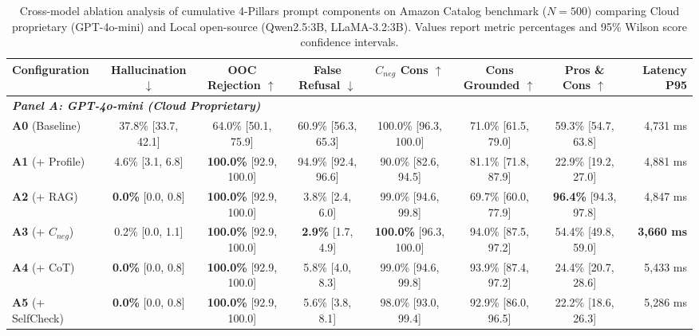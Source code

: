 
\begin{table}[t]
\centering
\caption{Cross-model ablation analysis of cumulative 4-Pillars prompt components on Amazon Catalog benchmark ($N=500$) comparing Cloud proprietary (GPT-4o-mini) and Local open-source (Qwen2.5:3B, LLaMA-3.2:3B). Values report metric percentages and 95\% Wilson score confidence intervals.}
\label{tab:ablation_study_3models}
\small
\begin{tabular}{lccccccr}
\toprule
\textbf{Configuration} & \textbf{Hallucination $\downarrow$} & \textbf{OOC Rejection $\uparrow$} & \textbf{False Refusal $\downarrow$} & \textbf{$C_{neg}$ Cons $\uparrow$} & \textbf{Cons Grounded $\uparrow$} & \textbf{Pros \& Cons $\uparrow$} & \textbf{Latency P95} \\
\midrule
\multicolumn{8}{l}{\textit{\textbf{Panel A: GPT-4o-mini (Cloud Proprietary)}}} \\
\textbf{A0} (Baseline) & 37.8\% [33.7, 42.1] & 64.0\% [50.1, 75.9] & 60.9\% [56.3, 65.3] & 100.0\% [96.3, 100.0] & 71.0\% [61.5, 79.0] & 59.3\% [54.7, 63.8] & 4,731 ms \\
\textbf{A1} (+ Profile) & 4.6\% [3.1, 6.8] & \textbf{100.0\%} [92.9, 100.0] & 94.9\% [92.4, 96.6] & 90.0\% [82.6, 94.5] & 81.1\% [71.8, 87.9] & 22.9\% [19.2, 27.0] & 4,881 ms \\
\textbf{A2} (+ RAG) & \textbf{0.0\%} [0.0, 0.8] & \textbf{100.0\%} [92.9, 100.0] & 3.8\% [2.4, 6.0] & 99.0\% [94.6, 99.8] & 69.7\% [60.0, 77.9] & \textbf{96.4\%} [94.3, 97.8] & 4,847 ms \\
\textbf{A3} (+ $C_{neg}$) & 0.2\% [0.0, 1.1] & \textbf{100.0\%} [92.9, 100.0] & \textbf{2.9\%} [1.7, 4.9] & \textbf{100.0\%} [96.3, 100.0] & 94.0\% [87.5, 97.2] & 54.4\% [49.8, 59.0] & \textbf{3,660 ms} \\
\textbf{A4} (+ CoT) & \textbf{0.0\%} [0.0, 0.8] & \textbf{100.0\%} [92.9, 100.0] & 5.8\% [4.0, 8.3] & 99.0\% [94.6, 99.8] & 93.9\% [87.4, 97.2] & 24.4\% [20.7, 28.6] & 5,433 ms \\
\textbf{A5} (+ SelfCheck) & \textbf{0.0\%} [0.0, 0.8] & \textbf{100.0\%} [92.9, 100.0] & 5.6\% [3.8, 8.1] & 98.0\% [93.0, 99.4] & 92.9\% [86.0, 96.5] & 22.2\% [18.6, 26.3] & 5,286 ms \\

\end{tabular}
\end{table}
